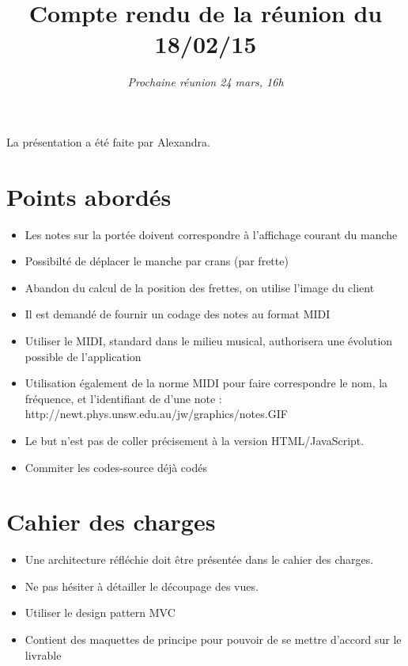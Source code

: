 \documentclass{scrartcl}
\begin{document}

\title{Compte rendu de la réunion du 18/02/15}
\subtitle{\textit{Prochaine réunion 24 mars, 16h}\vspace{-5ex}}
\date{}
\maketitle

La présentation a été faite par Alexandra.

\section{Points abordés}
\begin{itemize}
\item Les notes sur la portée doivent correspondre à l'affichage courant du manche
\item Possibilté de déplacer le manche par crans (par frette)
\item Abandon du calcul de la position des frettes, on utilise l'image du client
\item Il est demandé de fournir un codage des notes au format MIDI
\item Utiliser le MIDI, standard dans le milieu musical, authorisera une évolution possible de l'application
\item Utilisation également de la norme MIDI pour faire correspondre le nom, la fréquence, et l'identifiant de d'une note : http://newt.phys.unsw.edu.au/jw/graphics/notes.GIF
\item Le but n'est pas de coller précisement à la version HTML/JavaScript.
\item Commiter les codes-source déjà codés
\end{itemize}


\section{Cahier des charges}
\begin{itemize}
\item Une architecture réfléchie doit être présentée dans le cahier des charges.
\item Ne pas hésiter à détailler le découpage des vues.
\item Utiliser le design pattern MVC
\item Contient des maquettes de principe pour pouvoir de se mettre d'accord sur le livrable
\end{itemize}
\end{document}
